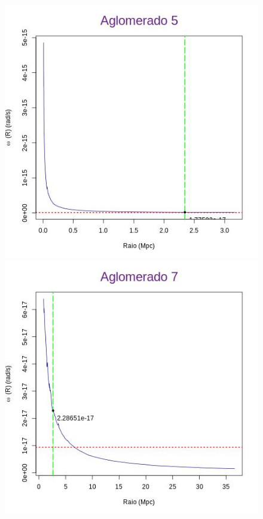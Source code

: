 \begin{apendicesenv}
\begin{figure}[H]
\begin{center}
\includegraphics[scale=.3]{04-figuras/selec20/perfil05}
\includegraphics[scale=.3]{04-figuras/selec20/perfil07}\hfill

\end{center}
\end{figure}
\end{apendicesenv}
